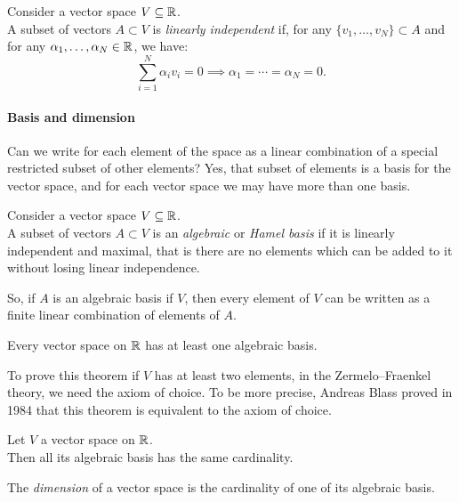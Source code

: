 \begin{defn}
	Consider a vector space $V \subseteq \mathbb R$. \\
	A subset of vectors $A \subset V$ is \emph{linearly independent} if, for any $\{v_1,\ldots, v_N\} \subset A$ and for any $\alpha_1,\ldots,\alpha_N \in \mathbb R$, we have:
	$$\sum_{i=1}^N \alpha_i v_i = 0 \implies \alpha_1=\cdots =\alpha_N = 0.$$
\end{defn}

\paragraph{Basis and dimension} Can we write for each element of the space as a linear combination of a special restricted subset of other elements? Yes, that subset of elements is a basis for the vector space, and for each vector space we may have more than one basis.

\begin{defn}
	Consider a vector space $V \subseteq \mathbb R$. \\
	A subset of vectors $A\subset V$  is an \emph{algebraic} or \emph{Hamel basis} if it is linearly independent and maximal, that is there are no elements which can be added to it without losing linear independence.
\end{defn}

So, if $A$ is an algebraic basis if $V$, then every element of $V$ can be written as a finite linear combination of elements of $A$.

\begin{theo} \label{fond-lin-alg}
	Every vector space on $\mathbb R$ has at least one algebraic basis.
\end{theo}
To prove this theorem if $V$ has at least two elements, in the Zermelo--Fraenkel theory, we need the axiom of choice. To be more precise, Andreas Blass proved in 1984 that this theorem is equivalent to the axiom of choice.

\begin{prop}
	Let $V$ a vector space on $\mathbb R$.\\
	Then all its algebraic basis has the same cardinality.
\end{prop}

\begin{defn}
	The \emph{dimension} of a vector space is the cardinality of one of its algebraic basis.
\end{defn}

